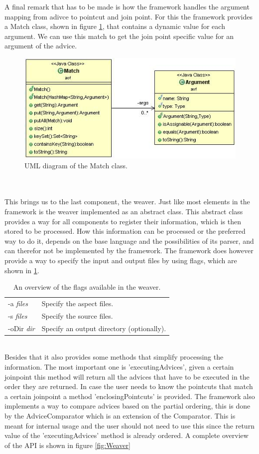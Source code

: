 \documentclass[a4paper]{report}
\begin{document}
A final remark that has to be made is how the framework handles the argument mapping from adivce to pointcut and join point. For this the framework provides a Match class, shown in figure \ref{fig:Match}, that contains a dynamic value for each argument. We can use this match to get the join point specific value for an argument of the advice.
\begin{figure}[h!]
\centering
\includegraphics[scale=0.7]{images/AOF/Match.jpg}
\caption{UML diagram of the Match class.}
\label{fig:Match}
\end{figure}\\
\\
This brings us to the last component, the weaver. Just like most elements in the framework is the weaver implemented as an abstract class. This abstract class provides a way for all components to register their information, which is then stored to be processed. How this information can be processed or the preferred way to do it, depends on the base language and the possibilities of its parser, and can therefor not be implemented by the framework. The framework does however provide a way to specify the input and output files by using flags, which are shown in \ref{tab:Flags}.\\
\begin{table}[h]
\centering
\begin{tabular}{l l}
-a \textit{files} & Specify the aspect files.\\ [2ex]
-s \textit{files} & Specify the source files.\\ [2ex]
-oDir \textit{dir} & Specify an output directory (optionally).\\
\end{tabular}
\caption{An overview of the flags available in the weaver.}
\label{tab:Flags}
\end{table}\\
Besides that it also provides some methods that simplify processing the information. The most important one is 'executingAdvices', given a certain joinpoint this method will return all the advices that have to be executed in the order they are returned. In case the user needs to know the pointcuts that match a certain joinpoint a method 'enclosingPointcuts' is provided. The framework also implements a way to compare advices based on the partial ordering, this is done by the AdviceComparator which is an extension of the Comparator. This is meant for internal usage and the user should not need to use this since the return value of the 'executingAdvices' method is already ordered. A complete overview of the API is shown in figure \ref{fig:Weaver}
\end{document}
